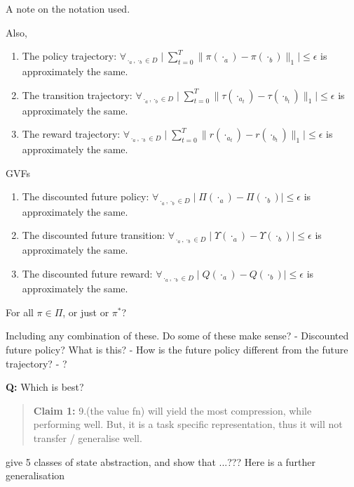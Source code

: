 A note on the notation used.

Also,

\begin{enumerate}
\def\labelenumi{\arabic{enumi}.}
\setcounter{enumi}{3}
\tightlist
\item
  The policy trajectory:
  \(\forall_{\cdot_a, \cdot_b \in D} \mid \sum_{t=0}^T \parallel \pi(\cdot_a) - \pi(\cdot_b)\parallel_1 \mid \le \epsilon\)
  is approximately the same.
\item
  The transition trajectory:
  \(\forall_{\cdot_a, \cdot_b \in D} \mid \sum_{t=0}^T\parallel \tau(\cdot_{a_t}) - \tau(\cdot_{b_t})\parallel_1\mid \le \epsilon\)
  is approximately the same.
\item
  The reward trajectory:
  \(\forall_{\cdot_a, \cdot_b \in D} \mid \sum_{t=0}^T \parallel r(\cdot_{a_t}) - r(\cdot_{b_t})\parallel_1 \mid \le \epsilon\)
  is approximately the same.
\end{enumerate}

GVFs


\begin{enumerate}
\def\labelenumi{\arabic{enumi}.}
\setcounter{enumi}{6}
\tightlist
\item
  The discounted future policy:
  \(\forall_{\cdot_a, \cdot_b \in D} \mid \Pi(\cdot_a) - \Pi(\cdot_b)\mid \le \epsilon\)
  is approximately the same.
\item
  The discounted future transition:
  \(\forall_{\cdot_a, \cdot_b \in D} \mid \Upsilon(\cdot_a) - \Upsilon (\cdot_b)\mid \le \epsilon\)
  is approximately the same.
\item
  The discounted future reward:
  \(\forall_{\cdot_a, \cdot_b \in D} \mid Q(\cdot_a) - Q(\cdot_b)\mid \le \epsilon\)
  is approximately the same.
\end{enumerate}

For all $\pi \in \Pi$, or just or $\pi^{* }$?

Including any combination of these.
Do some of these make sense?
- Discounted future policy? What is this?
- How is the future policy different from the future trajectory?
- ?

\textbf{Q:} Which is best?

\begin{quote}
\textbf{Claim 1:} 9.(the value fn) will yield the most compression,
while performing well. But, it is a task specific representation, thus
it will not transfer / generalise well.
\end{quote}


\cite{Littman2006} give 5 classes of state abstraction, and show that ...???
Here is a further generalisation


